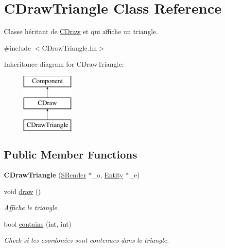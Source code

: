 \hypertarget{class_c_draw_triangle}{}\section{C\+Draw\+Triangle Class Reference}
\label{class_c_draw_triangle}


Classe héritant de \hyperlink{class_c_draw}{C\+Draw} et qui affiche un triangle.  




{\ttfamily \#include $<$C\+Draw\+Triangle.\+hh$>$}

Inheritance diagram for C\+Draw\+Triangle\+:\begin{figure}[H]
\begin{center}
\leavevmode
\includegraphics[height=3.000000cm]{class_c_draw_triangle}
\end{center}
\end{figure}
\subsection*{Public Member Functions}
\begin{DoxyCompactItemize}
\item 
\hypertarget{class_c_draw_triangle_abccc6d31eaa77adf1c8d972d10fdedc8}{}{\bfseries C\+Draw\+Triangle} (\hyperlink{class_s_render}{S\+Render} $\ast$\+\_\+o, \hyperlink{class_entity}{Entity} $\ast$\+\_\+e)\label{class_c_draw_triangle_abccc6d31eaa77adf1c8d972d10fdedc8}

\item 
\hypertarget{class_c_draw_triangle_adac4f1ef0652940baeb496f3a916437b}{}void \hyperlink{class_c_draw_triangle_adac4f1ef0652940baeb496f3a916437b}{draw} ()\label{class_c_draw_triangle_adac4f1ef0652940baeb496f3a916437b}

\begin{DoxyCompactList}\small\item\em Affiche le triangle. \end{DoxyCompactList}\item 
bool \hyperlink{class_c_draw_triangle_aedc4d96a23aad0355191a5fb55abc345}{contains} (int, int)
\begin{DoxyCompactList}\small\item\em Check si les coordonées sont contenues dans le triangle. \end{DoxyCompactList}\end{DoxyCompactItemize}
